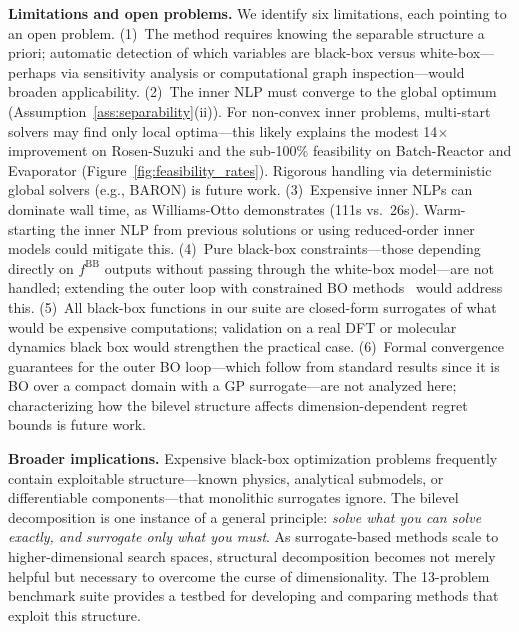 \documentclass[12pt,a4paper]{article}%
\theoremstyle{plain}%
\theoremstyle{remark}%
\theoremstyle{definition}%
\def\BB{\mathrm{BB}}
\begin{document}
\noindent\textbf{Limitations and open problems.}
We identify six limitations, each pointing to an open problem. (1)~The method requires knowing the separable structure a priori; automatic detection of which variables are black-box versus white-box---perhaps via sensitivity analysis or computational graph inspection---would broaden applicability. (2)~The inner NLP must converge to the global optimum (Assumption~\ref{ass:separability}(ii)). For non-convex inner problems, multi-start solvers may find only local optima---this likely explains the modest 14$\times$ improvement on Rosen-Suzuki and the sub-100\% feasibility on Batch-Reactor and Evaporator (Figure~\ref{fig:feasibility_rates}). Rigorous handling via deterministic global solvers (e.g., BARON) is future work. (3)~Expensive inner NLPs can dominate wall time, as Williams-Otto demonstrates (111s vs.\ 26s). Warm-starting the inner NLP from previous solutions or using reduced-order inner models could mitigate this. (4)~Pure black-box constraints---those depending directly on $f^{\BB}$ outputs without passing through the white-box model---are not handled; extending the outer loop with constrained BO methods~\cite{gardner2014,gelbart2014unknown} would address this. (5)~All black-box functions in our suite are closed-form surrogates of what would be expensive computations; validation on a real DFT or molecular dynamics black box would strengthen the practical case. (6)~Formal convergence guarantees for the outer BO loop---which follow from standard results since it is BO over a compact domain with a GP surrogate---are not analyzed here; characterizing how the bilevel structure affects dimension-dependent regret bounds is future work.

\noindent\textbf{Broader implications.}
Expensive black-box optimization problems frequently contain exploitable structure---known physics, analytical submodels, or differentiable components---that monolithic surrogates ignore. The bilevel decomposition is one instance of a general principle: \emph{solve what you can solve exactly, and surrogate only what you must}. As surrogate-based methods scale to higher-dimensional search spaces, structural decomposition becomes not merely helpful but necessary to overcome the curse of dimensionality. The 13-problem benchmark suite provides a testbed for developing and comparing methods that exploit this structure.

\end{document}
